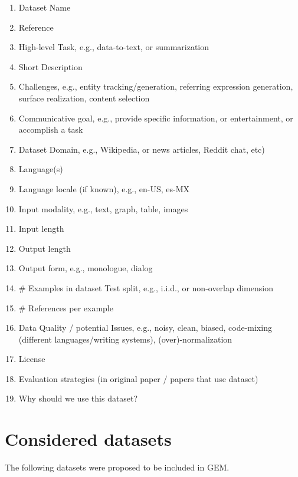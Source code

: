 \documentclass[11pt,a4paper]{article}
\newcommand{\GEM}{\textsc{GEM}}
\begin{document}
\begin{enumerate}[itemsep=0mm]
    \item Dataset Name
    \item Reference
    \item High-level Task, e.g., data-to-text, or summarization
    \item Short Description
    \item Challenges, e.g., entity tracking/generation, referring expression generation, surface realization, content selection
    \item Communicative goal, e.g., provide specific information, or entertainment, or accomplish a task
    \item Dataset Domain, e.g., Wikipedia, or news articles, Reddit chat, etc)
    \item Language(s)
    \item Language locale (if known), e.g., en-US, es-MX
    \item Input modality, e.g., text, graph, table, images
    \item Input length
    \item Output length
    \item Output form, e.g., monologue, dialog
    \item \# Examples in dataset	Test split, e.g., i.i.d., or non-overlap dimension
    \item \# References per example
    \item Data Quality / potential Issues, e.g., noisy, clean, biased, code-mixing (different languages/writing systems), (over)-normalization
    \item License
    \item Evaluation strategies (in original paper / papers that use dataset)
    \item Why should we use this dataset?
\end{enumerate}


\section{Considered datasets}
\label{app:considered}

The following datasets were proposed to be included in \GEM.
\end{document}
